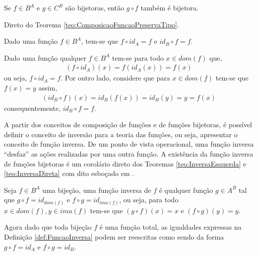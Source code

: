 \begin{corolario}\label{col:ComposicaoFuncaoPreservaTipo}
	Se $f \in B^A$ e $g \in C^B$ são bijetoras, então $g \circ f$ também é bijetora.
\end{corolario}

\begin{prova}
	Direto do Teorema \ref{teo:ComposicaoFuncaoPreservaTipo}.
\end{prova}

\begin{teorema}\label{teo:NeutralidadeDaFuncaoIdentidade}
	Dado uma função $f \in B^A$, tem-se que $f \circ id_A = f$ e $id_B \circ f = f$.
\end{teorema}

\begin{prova}
	Dado uma função qualquer $f \in B^A$ tem-se para todo $x \in dom(f)$ que, 
	\begin{eqnarray*}
		(f \circ id_A)(x) = f(id_A(x)) = f(x)
	\end{eqnarray*}
	ou seja, $f \circ id_A = f$. Por outro lado, considere que para $x \in dom(f)$ tem-se que $f(x) = y$ assim,
	\begin{eqnarray*}
		(id_B \circ f)(x) = id_B(f(x)) = id_B(y) = y = f(x)
	\end{eqnarray*}
	consequentemente, $id_B \circ f = f$.
\end{prova}

A partir dos conceitos de composição de funções e de funções bijetoras, é possível definir o conceito de inversão para a teoria das funções, ou seja, apresentar o conceito de função inversa. De um ponto de vista operacional, uma função inversa ``desfaz'' as ações realizadas por uma outra função. A existência da função inversa de funções bijetoras é um corolário direto dos Teoremas \ref{teo:InversaEsquerda} e \ref{teo:InversaDireta} com dito esboçado em \cite{zach2021-TC}.

\begin{definicao}\label{def:FuncaoInversa}
	Seja $f \in B^A$ uma bijeção, uma função inversa de $f$ é qualquer função $g \in A^B$ tal que $g \circ f = id_{dom(f)}$ e $f \circ g = id_{ima(f)}$, ou seja, para todo $x \in dom(f), y \in ima(f)$ tem-se que $(g \circ f)(x) = x$ e $(f \circ g)(y) = y$.
\end{definicao}

Agora dado que toda bijeção $f$ é uma função total, as igualdades expressas na Definição \ref{def:FuncaoInversa} podem ser reescritas como sendo da forma $g \circ f = id_{A}$ e $f \circ g = id_{B}$.

